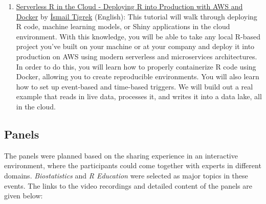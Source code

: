 \begin{enumerate}
\item
  \href{https://www.youtube.com/watch?v=dgkm0QkWXag}{Serverless R in the Cloud - Deploying R into Production with AWS and Docker} by \href{https://www.linkedin.com/in/ismailtigrek/}{İsmail Tigrek} (English):
  This tutorial will walk through deploying R code, machine learning models, or Shiny applications in the cloud environment. With this knowledge, you will be able to take any local R-based project you've built on your machine or at your company and deploy it into production on AWS using modern serverless and microservices architectures. In order to do this, you will learn how to properly containerize R code using Docker, allowing you to create reproducible environments. You will also learn how to set up event-based and time-based triggers. We will build out a real example that reads in live data, processes it, and writes it into a data lake, all in the cloud.
\end{enumerate}

\hypertarget{panels}{%
\subsection{Panels}\label{panels}}

The panels were planned based on the sharing experience in an interactive environment, where the participants could come together with experts in different domains. \emph{Biostatistics} and \emph{R Education} were selected as major topics in these events. The links to the video recordings and detailed content of the panels are given below:

